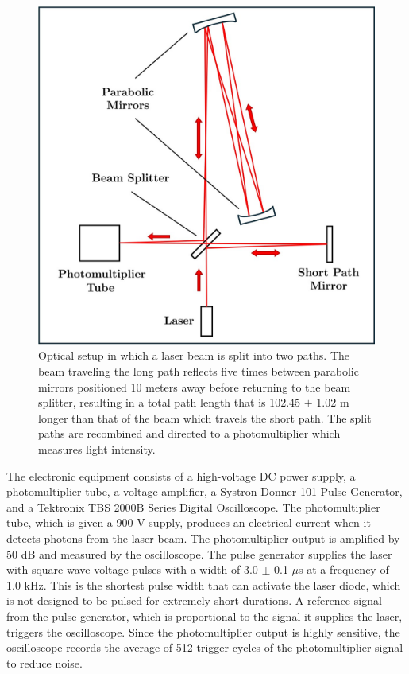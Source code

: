\documentclass[%
 reprint,
 amsmath,amssymb,
 aps,
]{revtex4-2}
\begin{document}
\begin{figure}[H]
\centering
\includegraphics[width=0.75\columnwidth]{Diagram.jpg}%
\caption{\label{fig:epsart} Optical setup in which a laser beam is split into two paths. The beam traveling the long path reflects five times between parabolic mirrors positioned 10 meters away before returning to the beam splitter, resulting in a total path length that is 102.45 $\pm$ 1.02 m longer than that of the beam which travels the short path. The split paths are recombined and directed to a photomultiplier which measures light intensity.}
\end{figure}

The electronic equipment consists of a high-voltage DC power supply, a photomultiplier tube, a voltage amplifier, a Systron Donner 101 Pulse Generator, and a Tektronix TBS 2000B Series Digital Oscilloscope. The photomultiplier tube, which is given a 900 V supply, produces an electrical current when it detects photons from the laser beam. The photomultiplier output is amplified by 50 dB and measured by the oscilloscope. The pulse generator supplies the laser with square-wave voltage pulses with a width of 3.0 $\pm$ 0.1 $\mu$s at a frequency of 1.0 kHz. This is the shortest pulse width that can activate the laser diode, which is not designed to be pulsed for extremely short durations. A reference signal from the pulse generator, which is proportional to the signal it supplies the laser, triggers the oscilloscope. Since the photomultiplier output is highly sensitive, the oscilloscope records the average of 512 trigger cycles of the photomultiplier signal to reduce noise.
\end{document}
